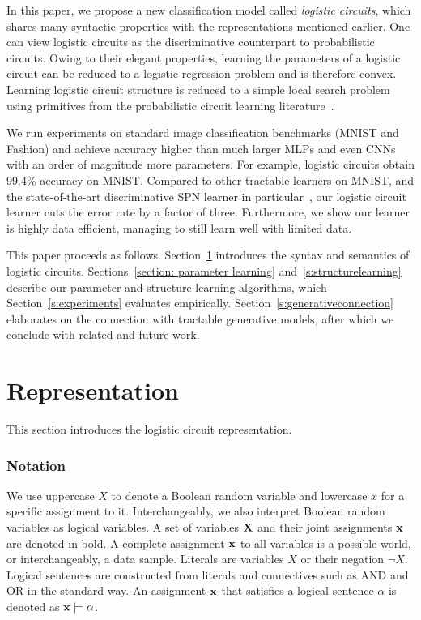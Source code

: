 \documentclass[letterpaper]{article} %
\begin{document}
In this paper, we propose a new classification model called \emph{logistic circuits}, which shares many syntactic properties with the representations mentioned earlier. One can view logistic circuits as the discriminative counterpart to probabilistic circuits. Owing to their elegant properties, learning the parameters of a logistic circuit can be reduced to a logistic regression problem and is therefore convex. 
Learning logistic circuit structure is reduced to a simple local search problem using primitives from the probabilistic circuit learning literature~\cite{Liang2017}.

We run experiments on standard image classification benchmarks (MNIST and Fashion) and achieve accuracy higher than much larger MLPs and even CNNs with an order of magnitude more parameters. For example, logistic circuits obtain 99.4\% accuracy on MNIST. 
Compared to other tractable learners on MNIST, and the state-of-the-art discriminative SPN learner in particular~\cite{rat-spn2018}, our logistic circuit learner cuts the error rate by a factor of three.
Furthermore, we show our learner is highly data efficient, managing to still learn well with limited data. 
 
This paper proceeds as follows. 
Section~\ref{s:representation} introduces the syntax and semantics of logistic circuits. 
Sections~\ref{section: parameter learning} and~\ref{s:structurelearning} describe our parameter and structure learning algorithms, which Section~\ref{s:experiments} evaluates empirically.
Section~\ref{s:generativeconnection} elaborates on the connection with tractable generative models, after which we conclude with related and future work.

 
\section{Representation} \label{s:representation}
This section introduces the logistic circuit representation.

\subsubsection*{Notation}
We use uppercase $X$ to denote a Boolean random variable and lowercase $x$ for a specific assignment to it. Interchangeably, we also interpret Boolean random variables as logical variables. A set of variables $\bf X$ and their joint assignments $\bf x$ are denoted in bold. A complete assignment $\bf x$ to all variables is a possible world, or interchangeably, a data sample. Literals are variables $X$ or their negation $\neg X$. Logical sentences are constructed from literals and connectives such as AND and OR in the standard way. An assignment $\bf x$ that satisfies a logical sentence $\alpha$ is denoted as ${\bf x} \models \alpha$. 
\end{document}
